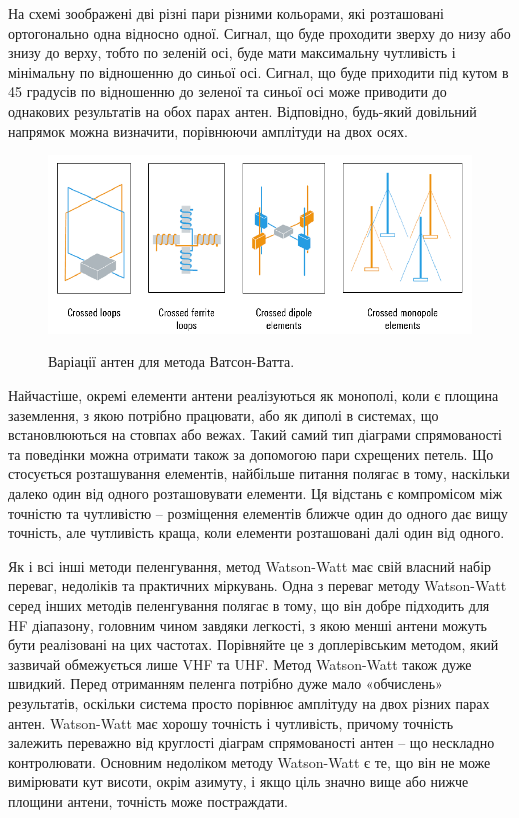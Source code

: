 \documentclass{article}
\begin{document}
На схемі зоображені дві різні пари різними кольорами, які розташовані ортогонально одна відносно одної. Сигнал, що буде проходити зверху до низу або знизу до верху, тобто по зеленій осі, буде мати максимальну чутливість і мінімальну по відношенню до синьої осі. Сигнал, що буде приходити під кутом в 45 градусів по відношенню до зеленої та синьої осі може приводити до однакових результатів на обох парах антен. Відповідно, будь-який довільний напрямок можна визначити, порівнюючи амплітуди на двох осях.

\begin{figure}[H]
	\centering
	{\includegraphics[width=0.7
		\linewidth]{images/adkock_antennas.png}}
	\caption{\label{fig:rdf:dopler} Варіації антен для метода Ватсон-Ватта.}
\end{figure}

Найчастіше, окремі елементи антени реалізуються як монополі, коли є площина заземлення, з якою потрібно працювати, або як диполі в системах, що встановлюються на стовпах або вежах. Такий самий тип діаграми спрямованості та поведінки можна отримати також за допомогою пари схрещених петель. Що стосується розташування елементів, найбільше питання полягає в тому, наскільки далеко один від одного розташовувати елементи. Ця відстань є компромісом між точністю та чутливістю – розміщення елементів ближче один до одного дає вищу точність, але чутливість краща, коли елементи розташовані далі один від одного.

Як і всі інші методи пеленгування, метод Watson-Watt має свій власний набір переваг, недоліків та практичних міркувань. Одна з переваг методу Watson-Watt серед інших методів пеленгування полягає в тому, що він добре підходить для HF діапазону, головним чином завдяки легкості, з якою менші антени можуть бути реалізовані на цих частотах. Порівняйте це з доплерівським методом, який зазвичай обмежується лише VHF та UHF. Метод Watson-Watt також дуже швидкий. Перед отриманням пеленга потрібно дуже мало «обчислень» результатів, оскільки система просто порівнює амплітуду
на двох різних парах антен. Watson-Watt має хорошу точність і чутливість, причому
точність залежить переважно від круглості діаграм спрямованості антен – що нескладно контролювати. Основним недоліком методу Watson-Watt є те, що він не може вимірювати кут висоти,
окрім азимуту, і якщо ціль значно вище або нижче площини антени, точність може постраждати.
\end{document}
